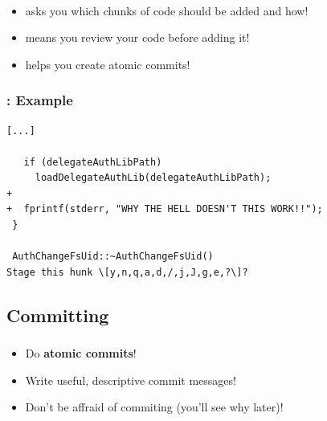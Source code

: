 
\begin{frame}
  \frametitle{\insertsubsection}

  \vspace{20pt}\\

  \begin{itemize}
    \item asks you which chunks of code should be added and how!
    \item means you review your code before adding it!
    \item helps you create atomic commits!
  \end{itemize}
\end{frame}


\begin{frame}[fragile]
  \frametitle{\insertsubsection: Example}

  \begin{small}
\begin{verbatim}
[...]

   if (delegateAuthLibPath)
     loadDelegateAuthLib(delegateAuthLibPath);
+
+  fprintf(stderr, "WHY THE HELL DOESN'T THIS WORK!!");
 }

 AuthChangeFsUid::~AuthChangeFsUid()
Stage this hunk \[y,n,q,a,d,/,j,J,g,e,?\]?
\end{verbatim}
  \end{small}

\end{frame}


\subsection{Committing}

\begin{frame}

  \begin{center}
    \textbf{\Huge{\insertsubsection}}
  \end{center}

\end{frame}


\begin{frame}
  \frametitle{\insertsubsection}

  \begin{center}
    \begin{itemize}
      \item Do \textbf{atomic commits}!
      \item Write useful, descriptive commit messages!
      \item Don't be affraid of commiting (you'll see why later)!
    \end{itemize}
  \end{center}

\end{frame}

